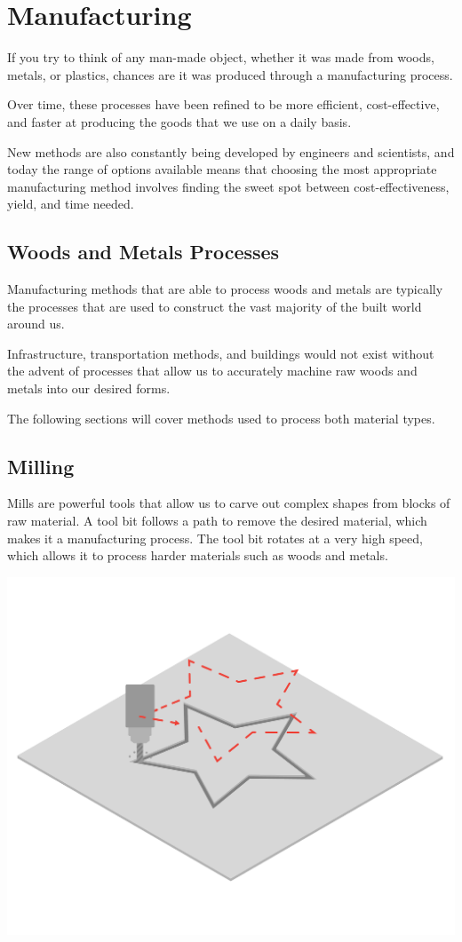 \chapter{Manufacturing}

If you try to think of any man-made object, whether it was made from woods, metals, or plastics, chances are it was produced through a manufacturing process.

Over time, these processes have been refined to be more efficient, cost-effective, and faster at producing the goods that we use on a daily basis.

New methods are also constantly being developed by engineers and scientists, and today the range of options available means that choosing the most appropriate manufacturing method involves finding the sweet spot between cost-effectiveness, yield, and time needed.

\section{Woods and Metals Processes}

Manufacturing methods that are able to process woods and metals are typically the processes that are used to construct the vast majority of the built world around us. 

Infrastructure, transportation methods, and buildings would not exist without the advent of processes that allow us to accurately machine raw woods and metals into our desired forms.

The following sections will cover methods used to process both material types.

\section{Milling}

Mills are powerful tools that allow us to carve out complex shapes from blocks of raw material. A tool bit follows a path to remove the desired material, which makes it a  manufacturing process. The tool bit rotates at a very high speed, which allows it to process harder materials such as woods and metals.

\includegraphics[width=.75\textwidth]{millWide.png}

